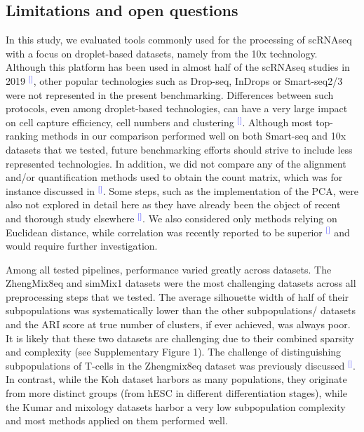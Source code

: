 \documentclass[11pt]{article}
\renewcommand{\cite}[1]{\textcolor{Blue}{$^[$\supercite{#1}$^]$}}
\begin{document}
\subsection*{Limitations and open questions}

In this study, we evaluated tools commonly used for the processing of scRNAseq with a focus on droplet-based datasets, namely from the 10x technology. Although this platform has been used in almost half of the scRNAseq studies in 2019 \cite{SvenssonDB2019}, other popular technologies such as Drop-seq, InDrops or Smart-seq2/3 were not represented in the present benchmarking. Differences between such protocols, even among droplet-based technologies, can have a very large impact on cell capture efficiency, cell numbers and clustering \cite{MereuCellAtlas2019, ZhangDroplet2019, SalomonDroplet2019}. Although most top-ranking methods in our comparison performed well on both Smart-seq and 10x datasets that we tested, future benchmarking efforts should strive to include less represented technologies. In addition, we did not compare any of the alignment and/or quantification methods used to obtain the count matrix, which was for instance discussed in \cite{viethSystematic2019}. Some steps, such as the implementation of the PCA, were also not explored in detail here as they have already been the object of recent and thorough study elsewhere \cite{SunDimRed2019, TsuyuzakiPCA2020}. We also considered only methods relying on Euclidean distance, while correlation was recently reported to be superior \cite{kim_impact_2019} and would require further investigation.

{\color{red}Among all tested pipelines, performance varied greatly across datasets. The ZhengMix8eq and simMix1 datasets were the most challenging datasets across all preprocessing steps that we tested. The average silhouette width of half of their subpopulations was systematically lower than the other subpopulations/ datasets and the ARI score at true number of clusters, if ever achieved, was always poor. It is likely that these two datasets are challenging due to their combined sparsity and complexity (see Supplementary Figure 1). The challenge of distinguishing subpopulations of T-cells in the Zhengmix8eq dataset was previously discussed \cite{duoClustering2018}. In contrast, while the Koh dataset harbors as many populations, they originate from more distinct groups (from hESC in different differentiation stages), while the Kumar and mixology datasets harbor a very low subpopulation complexity and most methods applied on them performed well.}
\end{document}

